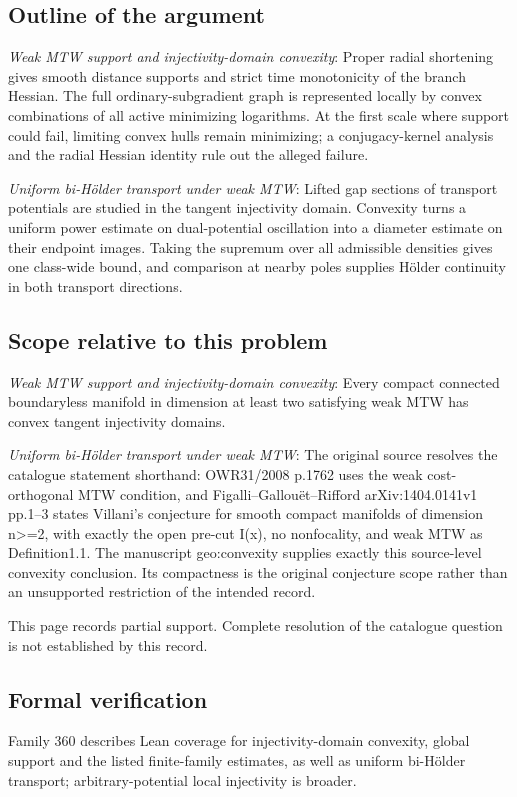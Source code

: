 \documentclass[11pt]{article}
\begin{document}
\subsection{Outline of the argument}
\textit{Weak MTW support and injectivity-domain convexity}: Proper radial shortening gives smooth distance supports and strict time monotonicity of the branch Hessian. The full ordinary-subgradient graph is represented locally by convex combinations of all active minimizing logarithms. At the first scale where support could fail, limiting convex hulls remain minimizing; a conjugacy-kernel analysis and the radial Hessian identity rule out the alleged failure.

\textit{Uniform bi-Hölder transport under weak MTW}: Lifted gap sections of transport potentials are studied in the tangent injectivity domain. Convexity turns a uniform power estimate on dual-potential oscillation into a diameter estimate on their endpoint images. Taking the supremum over all admissible densities gives one class-wide bound, and comparison at nearby poles supplies Hölder continuity in both transport directions.

\subsection{Scope relative to this problem}
\textit{Weak MTW support and injectivity-domain convexity}: Every compact connected boundaryless manifold in dimension at least two satisfying weak MTW has convex tangent injectivity domains.

\textit{Uniform bi-Hölder transport under weak MTW}: The original source resolves the catalogue statement shorthand: OWR31/2008 p.1762 uses the weak cost-orthogonal MTW condition, and Figalli–Gallouët–Rifford arXiv:1404.0141v1 pp.1–3 states Villani’s conjecture for smooth compact manifolds of dimension n>=2, with exactly the open pre-cut I(x), no nonfocality, and weak MTW as Definition1.1. The manuscript geo:convexity supplies exactly this source-level convexity conclusion. Its compactness is the original conjecture scope rather than an unsupported restriction of the intended record.

This page records partial support. Complete resolution of the catalogue question is not established by this record.

\subsection{Formal verification}
Family 360 describes Lean coverage for injectivity-domain convexity, global support and the listed finite-family estimates, as well as uniform bi-Hölder transport; arbitrary-potential local injectivity is broader.
\end{document}
